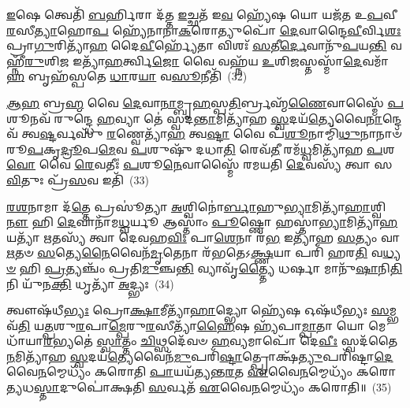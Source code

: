 {\anuvakamend[{𑌯𑌜᳴𑌮𑌾𑌨𑌮𑌾\-\ul{𑌹} 𑌵𑍃𑌷᳴𑌣𑍗 𑌜𑌾\-\ul{𑌤𑌾}\-𑌯𑌾𑌨𑍁᳴\-\ul{𑌬𑍍𑌰𑍂}\-𑌹𑍍𑌯\-\ul{𑌪𑍍𑌯}\-𑌷𑍍𑌟𑌾𑌦᳴𑌶 𑌚}]}%

\-\ul{𑌇}\-𑌷𑍇 𑌤𑍍𑌵𑍇𑌤𑌿᳴ \ul{𑌬}\-𑌰𑍍\mbox{}𑌹𑌿𑌰𑌾 𑌦᳴𑌤𑍍𑌤 \ul{𑌇}\-𑌚𑍍𑌛𑌤᳴ 𑌇\-\ul{𑌵} 𑌹𑍍𑌯𑍇᳴𑌷 𑌯𑍋 𑌯𑌜᳴𑌤 𑌉\-\ul{𑌪}\-𑌵𑍀\-\ul{𑌰}\-𑌸𑍀\-\ul{𑌤𑍍𑌯𑌾}\-𑌹𑍋\-\ul{𑌪} 𑌹𑍍𑌯𑍇᳴𑌨𑌾𑌨𑌾\-\ul{𑌕}\-𑌰𑍋𑌤𑍍𑌯𑍁𑌪𑍋᳴ \ul{𑌦𑍇}\-𑌵𑌾𑌨𑍍𑌦𑍈\-\ul{𑌵𑍀}\-𑌰𑍍𑌵𑌿\-\ul{𑌶𑌃} 𑌪𑍍𑌰𑌾\-\ul{𑌗𑍁}\-𑌰𑌿𑌤𑍍𑌯𑌾᳴\-\ul{𑌹} 𑌦𑍈\-\ul{𑌵𑍀}\-𑌰𑍍\mbox{}𑌹𑍍𑌯𑍇᳴𑌤𑌾 𑌵𑌿𑌶𑌃᳴ \ul{𑌸}\-𑌤𑍀\-\ul{𑌰𑍍𑌦𑍇}\-𑌵𑌾𑌨𑍁᳴\-\ul{𑌪}\-𑌯\-\ul{𑌨𑍍𑌤𑌿} 𑌵𑌹𑍍𑌨𑍀᳴\-\ul{𑌰𑍁}\-𑌶𑌿\-\ul{𑌜} 𑌇𑌤𑍍𑌯𑌾᳴\-\ul{𑌹}\-𑌰𑍍𑌤𑍍𑌵𑌿\-\ul{𑌜𑍋} 𑌵𑍈 𑌵𑌹𑍍𑌨᳴𑌯 \ul{𑌉}\-𑌶𑌿\-\ul{𑌜}\-𑌸𑍍𑌤𑌸𑍍𑌮𑌾᳴\-\ul{𑌦𑍇}\-𑌵𑌮𑌾᳴\-\ul{𑌹} 𑌬𑍃𑌹᳴𑌸𑍍𑌪𑌤𑍇 \ul{𑌧𑌾}\-𑌰\-\ul{𑌯𑌾} 𑌵\-\ul{𑌸𑍂}\-𑌨𑍀𑌤𑌿᳴~(32)

\-\ul{𑌆}\-\-\ul{𑌹} 𑌬𑍍𑌰\-\ul{𑌹𑍍𑌮} 𑌵𑍈 \ul{𑌦𑍇}\-𑌵𑌾\-\ul{𑌨𑌾}\-𑌮𑍍𑌬𑍃\-\ul{𑌹}\-𑌸𑍍𑌪\-\ul{𑌤𑌿}\-𑌰𑍍𑌬𑍍𑌰𑌹𑍍𑌮᳴\-\ul{𑌣𑍈}\-𑌵𑌾𑌸𑍍𑌮𑍈᳴ \ul{𑌪}\-𑌶𑍂𑌨𑌵᳴ 𑌰𑍁𑌨𑍍𑌦𑍍𑌧𑍇 \ul{𑌹}\-𑌵𑍍𑌯𑌾 𑌤𑍇॑ 𑌸𑍍𑌵𑌦\-\ul{𑌨𑍍𑌤𑌾}\-𑌮𑌿𑌤𑍍𑌯𑌾᳴𑌹 \ul{𑌸𑍍𑌵}\-𑌦𑌯᳴\-\ul{𑌤𑍍𑌯𑍇}\-𑌵𑍈\-\ul{𑌨𑌾}\-𑌨𑍍𑌦𑍇𑌵᳴ 𑌤𑍍𑌵\-\ul{𑌷𑍍𑌟}\-𑌰𑍍𑌵𑌸𑍁᳴ \ul{𑌰}\-𑌣𑍍𑌵𑍇𑌤𑍍𑌯𑌾᳴\-\ul{𑌹} 𑌤𑍍𑌵\-\ul{𑌷𑍍𑌟𑌾} 𑌵𑍈 𑌪᳴\-\ul{𑌶𑍂}\-𑌨𑌾𑌮𑍍𑌮𑌿᳴\-\ul{𑌥𑍁}\-𑌨𑌾𑌨𑌾𑍞᳴ 𑌰𑍂\-\ul{𑌪}\-𑌕𑍃\-\ul{𑌦𑍍𑌰𑍂}\-𑌪\-\ul{𑌮𑍇}\-𑌵 \ul{𑌪}\-𑌶𑍁𑌷𑍁᳴ 𑌦𑌧𑌾\-\ul{𑌤𑌿} 𑌰𑍇𑌵᳴\-\ul{𑌤𑍀} 𑌰𑌮᳴\-\ul{𑌧𑍍𑌵}\-𑌮𑌿𑌤𑍍𑌯𑌾᳴𑌹 \ul{𑌪}\-𑌶\-\ul{𑌵𑍋} 𑌵𑍈 \ul{𑌰𑍇}\-𑌵𑌤𑍀𑌃॑ \ul{𑌪}\-𑌶𑍂\-\ul{𑌨𑍇}\-𑌵𑌾𑌸𑍍𑌮𑍈᳴ 𑌰𑌮𑌯𑌤𑌿 \ul{𑌦𑍇}\-𑌵𑌸𑍍𑌯᳴ 𑌤𑍍𑌵𑌾 𑌸\-\ul{𑌵𑌿}\-𑌤𑍁𑌃 𑌪𑍍𑌰᳴\-\ul{𑌸}\-𑌵 𑌇𑌤𑌿᳴~(33)

\-\ul{𑌰}\-\-\ul{𑌶}\-𑌨𑌾𑌮𑌾 𑌦᳴\-\ul{𑌤𑍍𑌤𑍇} 𑌪𑍍𑌰𑌸𑍂॑𑌤𑍍𑌯𑌾 \ul{𑌅}\-𑌶𑍍𑌵𑌿𑌨𑍋॑\-\ul{𑌰𑍍𑌬𑌾}\-𑌹𑍁\-\ul{𑌭𑍍𑌯𑌾}\-𑌮𑌿𑌤𑍍𑌯𑌾᳴\-\ul{𑌹𑌾}\-𑌶𑍍𑌵𑌿\-\ul{𑌨𑍗} 𑌹𑌿 \ul{𑌦𑍇}\-𑌵𑌾𑌨𑌾᳴𑌮\-\ul{𑌧𑍍𑌵}\-𑌰𑍍𑌯𑍂 𑌆𑌸𑍍𑌤𑌾𑌂॑ \ul{𑌪𑍂}\-𑌷𑍍𑌣𑍋 𑌹𑌸𑍍𑌤𑌾॑\-\ul{𑌭𑍍𑌯𑌾}\-𑌮𑌿𑌤𑍍𑌯𑌾᳴\-\ul{𑌹} 𑌯𑌤𑍍𑌯𑌾᳴ \ul{𑌋}\-𑌤𑌸𑍍𑌯᳴ 𑌤𑍍𑌵𑌾 𑌦𑍇𑌵𑌹\-\ul{𑌵𑌿𑌃} 𑌪𑌾\-\ul{𑌶𑍇}\-𑌨𑌾 𑌰᳴\-\ul{𑌭} 𑌇𑌤𑍍𑌯𑌾᳴𑌹 \ul{𑌸}\-𑌤𑍍𑌯𑌂 𑌵𑌾 \ul{𑌋}\-𑌤𑍞 \ul{𑌸}\-𑌤𑍍𑌯𑍇\-\ul{𑌨𑍈}\-𑌵𑍈𑌨᳴\-\ul{𑌮𑍃}\-𑌤𑍇𑌨𑌾 𑌰᳴𑌭𑌤𑍇\-𑌽\-\ul{𑌕𑍍𑌷𑍍𑌣}\-𑌯𑌾 𑌪𑌰𑌿᳴ 𑌹𑌰\-\ul{𑌤𑌿} 𑌵\-\ul{𑌧𑍍𑌯}\-\-\ul{𑍞} 𑌹𑌿 \ul{𑌪𑍍𑌰}\-𑌤𑍍𑌯𑌞𑍍𑌚𑌂᳴ 𑌪𑍍𑌰𑌤𑌿\-\ul{𑌮𑍁}\-𑌞𑍍𑌚\-\ul{𑌨𑍍𑌤𑌿} 𑌵𑍍𑌯𑌾𑌵𑍃᳴\-\ul{𑌤𑍍𑌤𑍍𑌯𑍈} 𑌧𑌰𑍍\mbox{}\-\ul{𑌷𑌾} 𑌮𑌾𑌨𑍁᳴\-\ul{𑌷𑌾}\-𑌨𑌿\-\ul{𑌤𑌿} 𑌨𑌿 𑌯𑍁᳴𑌨\-\ul{𑌕𑍍𑌤𑌿} 𑌧𑍃𑌤𑍍𑌯𑌾᳴ \ul{𑌅}\-𑌦𑍍𑌭𑍍𑌯𑌃~(34)

𑌤𑍍𑌵𑍗𑌷᳴𑌧𑍀\-\ul{𑌭𑍍𑌯𑌃} 𑌪𑍍𑌰𑍋\-\ul{𑌕𑍍𑌷𑌾}\-𑌮𑍀𑌤𑍍𑌯𑌾᳴\-\ul{𑌹𑌾}\-𑌦𑍍𑌭𑍍𑌯𑍋 𑌹𑍍𑌯𑍇᳴𑌷 𑌓𑌷᳴𑌧𑍀𑌭𑍍𑌯𑌃 \ul{𑌸}\-𑌮𑍍𑌭𑌵᳴\-\ul{𑌤𑌿} 𑌯\-\ul{𑌤𑍍𑌪}\-𑌶𑍁\-\ul{𑌰}\-𑌪𑌾\-\ul{𑌮𑍍𑌪𑍇}\-𑌰𑍁\-\ul{𑌰}\-𑌸𑍀𑌤𑍍𑌯𑌾᳴\-\ul{𑌹𑍈}\-𑌷 𑌹𑍍𑌯᳴𑌪𑌾\-\ul{𑌮𑍍𑌪𑌾}\-𑌤𑌾 𑌯𑍋 𑌮𑍇𑌧𑌾᳴𑌯𑌾\-\ul{𑌰}\-𑌭𑍍𑌯𑌤𑍇॑ \ul{𑌸𑍍𑌵𑌾}\-𑌤𑍍𑌤𑌂 \ul{𑌚𑌿}\-𑌥𑍍𑌸𑌦𑍇᳴𑌵𑍞 \ul{𑌹}\-𑌵𑍍𑌯𑌮𑌾𑌪𑍋᳴ 𑌦𑍇\-\ul{𑌵𑍀𑌃} 𑌸𑍍𑌵𑌦᳴𑌤𑍈\-\ul{𑌨}\-𑌮𑌿𑌤𑍍𑌯𑌾᳴𑌹 \ul{𑌸𑍍𑌵}\-𑌦𑌯᳴\-\ul{𑌤𑍍𑌯𑍇}\-𑌵𑍈𑌨᳴\-\ul{𑌮𑍁}\-𑌪𑌰𑌿᳴\-\ul{𑌷𑍍𑌟𑌾}\-𑌤𑍍𑌪𑍍𑌰𑍋𑌕𑍍𑌷᳴\-\ul{𑌤𑍍𑌯𑍁}\-𑌪𑌰𑌿᳴𑌷𑍍𑌟𑌾\-\ul{𑌦𑍇}\-𑌵𑍈\-\ul{𑌨}\-𑌮𑍍𑌮𑍇𑌧𑍍𑌯𑌂᳴ 𑌕𑌰𑍋𑌤𑌿 \ul{𑌪𑌾}\-𑌯𑌯᳴𑌤𑍍𑌯𑌨𑍍𑌤\-\ul{𑌰}\-𑌤 \ul{𑌏}\-𑌵𑍈\-\ul{𑌨}\-𑌮𑍍𑌮𑍇𑌧𑍍𑌯𑌂᳴ 𑌕𑌰𑍋\-\ul{𑌤𑍍𑌯}\-𑌧\-\ul{𑌸𑍍𑌤𑌾}\-𑌦𑍁𑌪𑍋॑𑌕𑍍𑌷𑌤𑌿 \ul{𑌸}\-𑌰𑍍𑌵𑌤᳴ \ul{𑌏}\-𑌵𑍈\-\ul{𑌨}\-𑌮𑍍𑌮𑍇𑌧𑍍𑌯𑌂᳴ 𑌕𑌰𑍋𑌤𑌿॥~(35)

